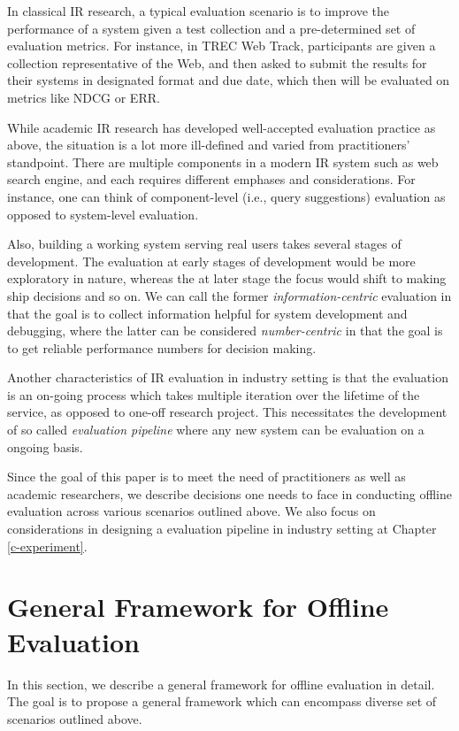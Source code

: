 \documentclass[openany]{now} %
\begin{document}
In classical IR research, a typical evaluation scenario is to improve the performance of a system given a test collection and a pre-determined set of evaluation metrics. For instance, in TREC Web Track, participants are given a collection representative of the Web, and then asked to submit the results for their systems in designated format and due date, which then will be evaluated on metrics like NDCG or ERR.

While academic IR research has developed well-accepted evaluation practice as above, the situation is a lot more ill-defined and varied from practitioners' standpoint. There are multiple components in a modern IR system such as web search engine, and each requires different emphases and considerations. For instance, one can think of component-level (i.e., query suggestions) evaluation as opposed to system-level evaluation. 

Also, building a working system serving real users takes several stages of development. The evaluation at early stages of development would be more exploratory in nature, whereas the at later stage the focus would shift to making ship decisions and so on. We can call the former \textit{information-centric} evaluation in that the goal is to collect information helpful for system development and debugging, where the latter can be considered \textit{number-centric} in that the goal is to get reliable performance numbers for decision making.

Another characteristics of IR evaluation in industry setting is that the evaluation is an on-going process which takes multiple iteration over the lifetime of the service, as opposed to one-off research project. This necessitates the development of so called \textit{evaluation pipeline} where any new system can be evaluation on a ongoing basis.  

Since the goal of this paper is to meet the need of practitioners as well as academic researchers, we describe decisions one needs to face in conducting offline evaluation across various scenarios outlined above. We also focus on considerations in designing a evaluation pipeline in industry setting at Chapter \ref{c-experiment}.

\section{General Framework for Offline Evaluation}

In this section, we describe a general framework for offline evaluation in detail. The goal is to propose a general framework which can encompass diverse set of scenarios outlined above. 
\end{document}
